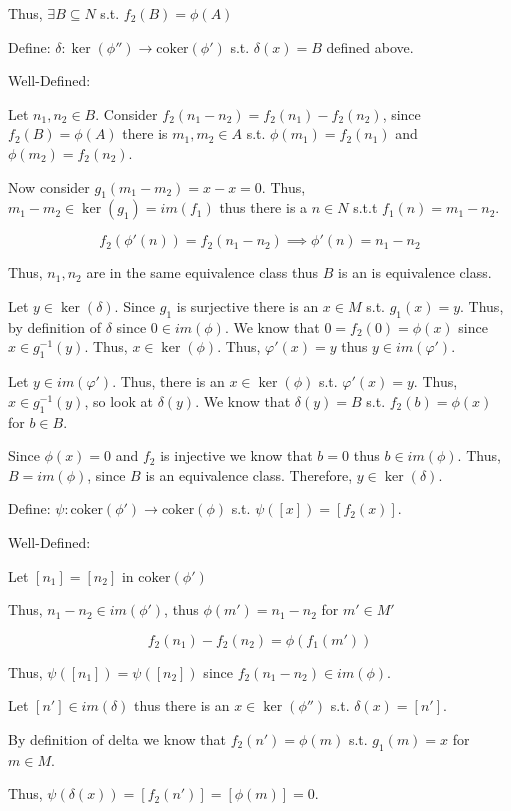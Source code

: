 \documentclass[12pt, letterpaper]{article}
\renewcommand{\t}[1]{\text{#1}}
\newcommand{\coker}{\mathrm{coker}}
\begin{document}
\begin{problemproof}
    Thus, $\exists B \subseteq N$ s.t. $f_2(B)=\phi(A)$
    
    Define: $\delta: \ker(\phi'') \to \t{coker}(\phi')$ s.t. $\delta(x)=B$ defined above.

    Well-Defined:

    Let $n_1,n_2 \in B$. Consider $f_2(n_1-n_2)=f_2(n_1)-f_2(n_2)$, since $f_2(B)=\phi(A)$ there is $m_1,m_2 \in A$ s.t. $\phi(m_1)=f_2(n_1)$ and $\phi(m_2)=f_2(n_2)$.

    Now consider $g_1(m_1-m_2)=x-x=0$. Thus, $m_1-m_2 \in \ker(g_1)=im(f_1)$ thus there is a $n \in N$ s.t.t $f_1(n)=m_1-n_2$.

    \[f_2(\phi'(n))=f_2(n_1-n_2) \implies \phi'(n)=n_1-n_2\]

    Thus, $n_1,n_2$ are in the same equivalence class thus $B$ is an is equivalence class.

    Let $y \in \ker(\delta)$. Since $g_1$ is surjective there is an $x \in M$ s.t. $g_1(x)=y$. Thus, by definition of $\delta$ since $0 \in im(\phi)$. We know that $0=f_2(0)=\phi(x)$ since $x \in g_1^{-1}(y)$. Thus, $x \in \ker(\phi)$. Thus, $\varphi'(x)=y$ thus $y \in im(\varphi')$.

    Let $y \in im(\varphi')$. Thus, there is an $x \in \ker(\phi)$ s.t. $\varphi'(x)=y$. Thus, $x \in g_1^{-1}(y)$, so look at $\delta(y)$. We know that $\delta(y)=B$ s.t. $f_2(b)=\phi(x)$ for $b \in B$.

    Since $\phi(x)=0$ and $f_2$ is injective we know that $b=0$ thus $b \in im(\phi)$. Thus, $B=im(\phi)$, since $B$ is an equivalence class. Therefore, $y \in \ker(\delta)$.

    Define: $\psi: \coker(\phi') \to \coker(\phi)$ s.t. $\psi([x])=[f_2(x)]$.

    Well-Defined:

    Let $[n_1]=[n_2]$ in $\coker(\phi')$

    Thus, $n_1-n_2 \in im(\phi')$, thus $\phi(m')=n_1-n_2$ for $m' \in M'$

    \[f_2(n_1)-f_2(n_2)=\phi(f_1(m'))\]

    Thus, $\psi([n_1])=\psi([n_2])$ since $f_2(n_1-n_2) \in im(\phi)$.

    Let $[n'] \in im(\delta)$ thus there is an $x \in \ker(\phi'')$ s.t. $\delta(x)=[n']$.

    By definition of delta we know that $f_2(n')=\phi(m)$ s.t. $g_1(m)=x$ for $m \in M$.

    Thus, $\psi(\delta(x))=[f_2(n')]=[\phi(m)]=0$.


\end{problemproof}
\end{document}
